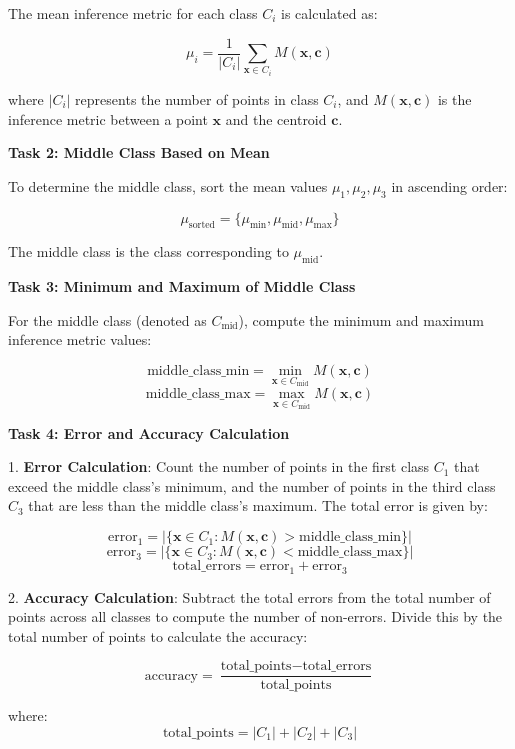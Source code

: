 The mean inference metric for each class \( C_i \) is calculated as:

\[
\mu_i = \frac{1}{|C_i|} \sum_{\mathbf{x} \in C_i} M(\mathbf{x}, \mathbf{c})
\]

where \( |C_i| \) represents the number of points in class \( C_i \), and \( M(\mathbf{x}, \mathbf{c}) \) is the inference metric between a point \( \mathbf{x} \) and the centroid \( \mathbf{c} \).

\textbf{Task 2: Middle Class Based on Mean}

To determine the middle class, sort the mean values \( \mu_1, \mu_2, \mu_3 \) in ascending order:

\[
\mu_{\text{sorted}} = \{\mu_{\text{min}}, \mu_{\text{mid}}, \mu_{\text{max}}\}
\]

The middle class is the class corresponding to \( \mu_{\text{mid}} \).

\textbf{Task 3: Minimum and Maximum of Middle Class}

For the middle class (denoted as \( C_{\text{mid}} \)), compute the minimum and maximum inference metric values:

\[
\text{middle\_class\_min} = \min_{\mathbf{x} \in C_{\text{mid}}} M(\mathbf{x}, \mathbf{c})
\]
\[
\text{middle\_class\_max} = \max_{\mathbf{x} \in C_{\text{mid}}} M(\mathbf{x}, \mathbf{c})
\]

\textbf{Task 4: Error and Accuracy Calculation}

1. \textbf{Error Calculation}: Count the number of points in the first class \( C_1 \) that exceed the middle class's minimum, and the number of points in the third class \( C_3 \) that are less than the middle class's maximum. The total error is given by:

\[
\text{error}_1 = \left| \{\mathbf{x} \in C_1 : M(\mathbf{x}, \mathbf{c}) > \text{middle\_class\_min} \} \right|
\]
\[
\text{error}_3 = \left| \{\mathbf{x} \in C_3 : M(\mathbf{x}, \mathbf{c}) < \text{middle\_class\_max} \} \right|
\]
\[
\text{total\_errors} = \text{error}_1 + \text{error}_3
\]

2. \textbf{Accuracy Calculation}: Subtract the total errors from the total number of points across all classes to compute the number of non-errors. Divide this by the total number of points to calculate the accuracy:

\[
\text{accuracy} = \frac{\text{total\_points} - \text{total\_errors}}{\text{total\_points}}
\]

where:
\[
\text{total\_points} = |C_1| + |C_2| + |C_3|
\]

